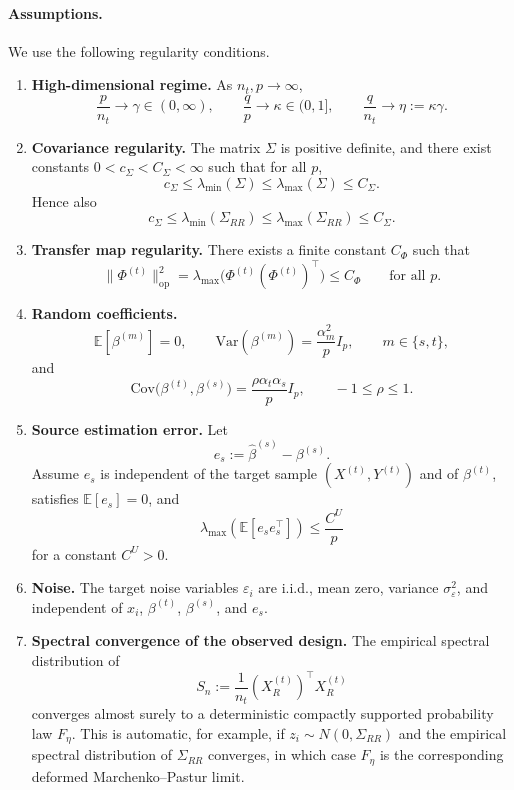 \documentclass[11pt]{article}
\newcommand{\1}{\mathbf{1}}
\begin{document}
\bigskip

\paragraph{Assumptions.}
We use the following regularity conditions.

\begin{enumerate}
\item[(A1)] \textbf{High-dimensional regime.}
As \(n_t,p\to\infty\),
\[
\frac{p}{n_t}\to\gamma\in(0,\infty),
\qquad
\frac{q}{p}\to\kappa\in(0,1],
\qquad
\frac{q}{n_t}\to\eta:=\kappa\gamma.
\]

\item[(A2)] \textbf{Covariance regularity.}
The matrix \(\Sigma\) is positive definite, and there exist constants
\(0<c_\Sigma<C_\Sigma<\infty\) such that for all \(p\),
\[
c_\Sigma\le \lambda_{\min}(\Sigma)\le \lambda_{\max}(\Sigma)\le C_\Sigma.
\]
Hence also
\[
c_\Sigma\le \lambda_{\min}(\Sigma_{RR})\le \lambda_{\max}(\Sigma_{RR})\le C_\Sigma.
\]

\item[(A3)] \textbf{Transfer map regularity.}
There exists a finite constant \(C_\Phi\) such that
\[
\|\Phi^{(t)}\|_{\mathrm{op}}^2
=
\lambda_{\max}\!\bigl(\Phi^{(t)}(\Phi^{(t)})^\top\bigr)
\le C_\Phi
\qquad\text{for all }p.
\]

\item[(A4)] \textbf{Random coefficients.}
\[
\mathbb E[\beta^{(m)}]=0,\qquad
\mathrm{Var}(\beta^{(m)})=\frac{\alpha_m^2}{p}I_p,\qquad m\in\{s,t\},
\]
and
\[
\mathrm{Cov}\!\bigl(\beta^{(t)},\beta^{(s)}\bigr)
=
\frac{\rho\alpha_t\alpha_s}{p}I_p,
\qquad -1\le \rho\le 1.
\]

\item[(A5)] \textbf{Source estimation error.}
Let
\[
e_s:=\hat\beta^{(s)}-\beta^{(s)}.
\]
Assume \(e_s\) is independent of the target sample \((X^{(t)},Y^{(t)})\) and of \(\beta^{(t)}\), satisfies \(\mathbb E[e_s]=0\), and
\[
\lambda_{\max}\!\left(\mathbb E[e_s e_s^\top]\right)\le \frac{C^U}{p}
\]
for a constant \(C^U>0\).

\item[(A6)] \textbf{Noise.}
The target noise variables \(\varepsilon_i\) are i.i.d., mean zero, variance \(\sigma_\varepsilon^2\), and independent of \(x_i\), \(\beta^{(t)}\), \(\beta^{(s)}\), and \(e_s\).

\item[(A7)] \textbf{Spectral convergence of the observed design.}
The empirical spectral distribution of
\[
S_n:=\frac1{n_t}(X_R^{(t)})^\top X_R^{(t)}
\]
converges almost surely to a deterministic compactly supported probability law \(F_\eta\).
This is automatic, for example, if \(z_i\sim N(0,\Sigma_{RR})\) and the empirical spectral distribution of \(\Sigma_{RR}\) converges, in which case \(F_\eta\) is the corresponding deformed Marchenko--Pastur limit.
\end{enumerate}
\end{document}
